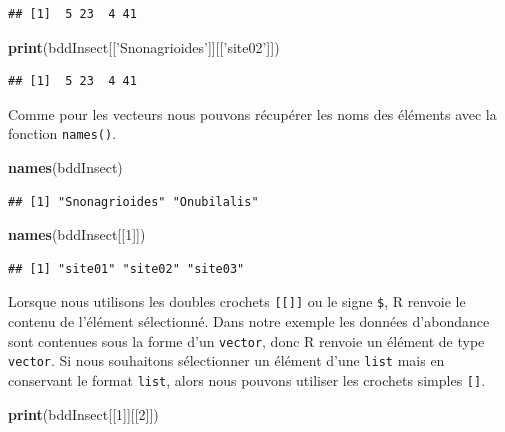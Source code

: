 \documentclass[twoside,symmetric]{book}
\newenvironment{Shaded}{}{}
\newcommand{\DecValTok}[1]{#1}
\newcommand{\KeywordTok}[1]{\textbf{#1}}
\newcommand{\NormalTok}[1]{#1}
\newcommand{\StringTok}[1]{#1}
\begin{document}
\begin{verbatim}
## [1]  5 23  4 41
\end{verbatim}

\begin{Shaded}
\begin{Highlighting}[]
\KeywordTok{print}\NormalTok{(bddInsect[[}\StringTok{'Snonagrioides'}\NormalTok{]][[}\StringTok{'site02'}\NormalTok{]])}
\end{Highlighting}
\end{Shaded}

\begin{verbatim}
## [1]  5 23  4 41
\end{verbatim}

Comme pour les vecteurs nous pouvons récupérer les noms des éléments avec la fonction \texttt{names()}.

\begin{Shaded}
\begin{Highlighting}[]
\KeywordTok{names}\NormalTok{(bddInsect)}
\end{Highlighting}
\end{Shaded}

\begin{verbatim}
## [1] "Snonagrioides" "Onubilalis"
\end{verbatim}

\begin{Shaded}
\begin{Highlighting}[]
\KeywordTok{names}\NormalTok{(bddInsect[[}\DecValTok{1}\NormalTok{]])}
\end{Highlighting}
\end{Shaded}

\begin{verbatim}
## [1] "site01" "site02" "site03"
\end{verbatim}

Lorsque nous utilisons les doubles crochets \texttt{{[}{[}{]}{]}} ou le signe \texttt{\$}, R renvoie le contenu de l'élément sélectionné. Dans notre exemple les données d'abondance sont contenues sous la forme d'un \texttt{vector}, donc R renvoie un élément de type \texttt{vector}. Si nous souhaitons sélectionner un élément d'une \texttt{list} mais en conservant le format \texttt{list}, alors nous pouvons utiliser les crochets simples \texttt{{[}{]}}.

\begin{Shaded}
\begin{Highlighting}[]
\KeywordTok{print}\NormalTok{(bddInsect[[}\DecValTok{1}\NormalTok{]][[}\DecValTok{2}\NormalTok{]])}
\end{Highlighting}
\end{Shaded}
\end{document}
